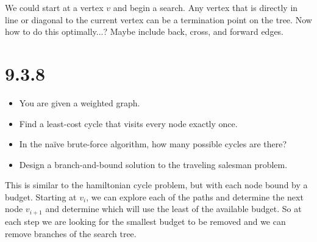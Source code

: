 \documentclass[12pt, letterpaper, twoside]{article}
\begin{document}
We could start at a vertex $v$ and begin a search. 
Any vertex that is directly in line or diagonal to the current vertex can be a termination
point on the tree. Now how to do this optimally...? Maybe include back, cross, and forward edges.


\section*{9.3.8}
\begin{itemize}
    \item You are given a weighted graph.
    \item Find a least-cost cycle that visits every node exactly once.
    \item In the naïve brute-force algorithm, how many possible cycles are there?
    \item Design a branch-and-bound solution to the traveling salesman problem.
\end{itemize}

This is similar to the hamiltonian cycle problem, but with each node bound by a budget.
Starting at $v_i$, we can explore each of the paths and determine the next node $v_{i+1}$
and determine which will use the least of the available budget. So at each step we are 
looking for the smallest budget to be removed and we can remove branches of the search tree.
\end{document}

